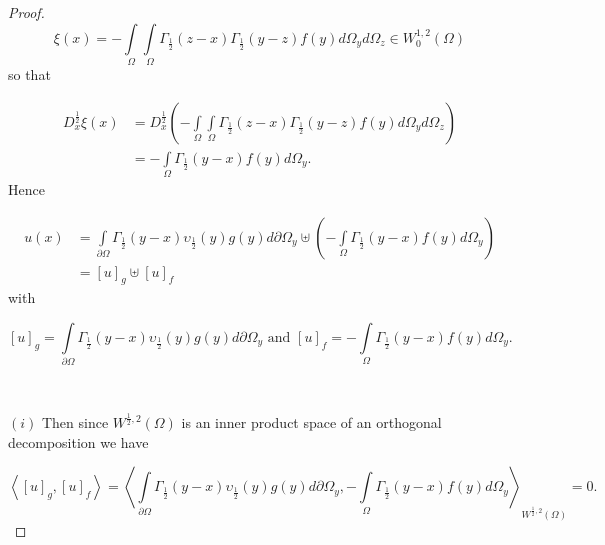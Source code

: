 \documentclass{amsart}%
\theoremstyle{plain}
\numberwithin{equation}{section}
\begin{document}
\begin{proof}
\[
\xi\left(  x\right)  =-%
{\displaystyle\int\limits_{\Omega}}
{\displaystyle\int\limits_{\Omega}}
\Gamma_{\frac{1}{2}}\left(  z-x\right)  \Gamma_{\frac{1}{2}}\left(
y-z\right)  f(y)d\Omega_{y}d\Omega_{z}\in W_{0}^{1,2}\left(  \Omega\right)
\]
so that \ \ \ %

\begin{align*}
D_{x}^{\frac{1}{2}}\xi\left(  x\right)   & =D_{x}^{\frac{1}{2}}\left(  -%
{\displaystyle\int\limits_{\Omega}}
{\displaystyle\int\limits_{\Omega}}
\Gamma_{\frac{1}{2}}\left(  z-x\right)  \Gamma_{\frac{1}{2}}\left(
y-z\right)  f(y)d\Omega_{y}d\Omega_{z}\right) \\
& =-%
{\displaystyle\int\limits_{\Omega}}
\Gamma_{\frac{1}{2}}\left(  y-x\right)  f(y)d\Omega_{y}\text{.}%
\end{align*}
Hence \ %

\begin{align*}
u(x)  & =%
{\displaystyle\int\limits_{\partial\Omega}}
\Gamma_{\frac{1}{2}}\left(  y-x\right)  \upsilon_{\frac{1}{2}}\left(
y\right)  g(y)d\partial\Omega_{y}\uplus\left(  -%
{\displaystyle\int\limits_{\Omega}}
\Gamma_{\frac{1}{2}}\left(  y-x\right)  f(y)d\Omega_{y}\right) \\
& =\left[  u\right]  _{g}\uplus\left[  u\right]  _{f}%
\end{align*}
with%

\[
\left[  u\right]  _{g}=%
{\displaystyle\int\limits_{\partial\Omega}}
\Gamma_{\frac{1}{2}}\left(  y-x\right)  \upsilon_{\frac{1}{2}}\left(
y\right)  g(y)d\partial\Omega_{y}\text{ \ \ and \ \ }\left[  u\right]  _{f}=-%
{\displaystyle\int\limits_{\Omega}}
\Gamma_{\frac{1}{2}}\left(  y-x\right)  f(y)d\Omega_{y}\text{.}%
\]


\ 

$\left(  i\right)  $ Then since $W^{\frac{1}{2},2}\left(  \Omega\right)  $ is
an inner product space of an orthogonal decomposition we have%

\[
\left\langle \left[  u\right]  _{g},\left[  u\right]  _{f}\right\rangle
=\left\langle
{\displaystyle\int\limits_{\partial\Omega}}
\Gamma_{\frac{1}{2}}\left(  y-x\right)  \upsilon_{\frac{1}{2}}\left(
y\right)  g(y)d\partial\Omega_{y},-%
{\displaystyle\int\limits_{\Omega}}
\Gamma_{\frac{1}{2}}\left(  y-x\right)  f(y)d\Omega_{y}\right\rangle
_{W^{\frac{1}{2},2}\left(  \Omega\right)  }=0\text{.}%
\]



\end{proof}
\end{document}
